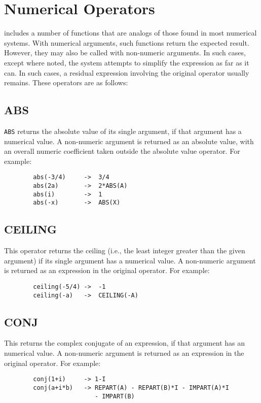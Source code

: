 \section{Numerical Operators}
{\REDUCE} includes a number of functions that are analogs of those found
in most numerical systems.  With numerical arguments, such functions
return the expected result.  However, they may also be called with
non-numeric arguments.  In such cases, except where noted, the system
attempts to simplify the expression as far as it can.  In such cases, a
residual expression involving the original operator usually remains.
These operators are as follows:

\subsection{ABS}
{\tt ABS}  returns the absolute value
of its single argument, if that argument has a numerical value.
A non-numeric argument is returned as an absolute value, with an overall
numeric coefficient taken outside the absolute value operator. For example:
\begin{verbatim}
        abs(-3/4)     ->  3/4
        abs(2a)       ->  2*ABS(A)
        abs(i)        ->  1
        abs(-x)       ->  ABS(X)
\end{verbatim}

\subsection{CEILING} 
This operator returns the ceiling (i.e., the least integer greater than
the given argument) if its single argument has a numerical value.  A
non-numeric argument is returned as an expression in the original
operator.  For example:

\begin{verbatim}
        ceiling(-5/4) ->  -1
        ceiling(-a)   ->  CEILING(-A)
\end{verbatim}

\subsection{CONJ} 
This returns the complex conjugate
of an expression, if that argument has an numerical value.  A
non-numeric argument is returned as an expression in the original
operator.  For example:
\begin{verbatim}
        conj(1+i)     -> 1-I
        conj(a+i*b)   -> REPART(A) - REPART(B)*I - IMPART(A)*I
                         - IMPART(B)
\end{verbatim}

